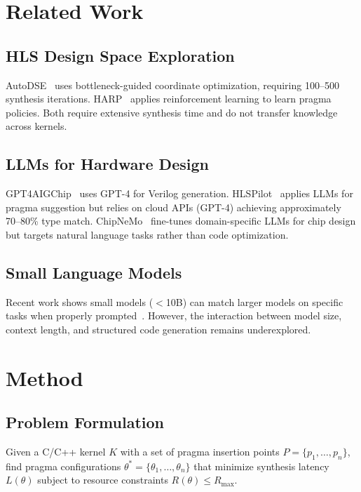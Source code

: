 \documentclass[conference]{IEEEtran}
\begin{document}
\section{Related Work}

\subsection{HLS Design Space Exploration}
AutoDSE~\cite{autodse} uses bottleneck-guided coordinate optimization, requiring
100--500 synthesis iterations. HARP~\cite{harp} applies reinforcement learning
to learn pragma policies. Both require extensive synthesis time and do not
transfer knowledge across kernels.

\subsection{LLMs for Hardware Design}
GPT4AIGChip~\cite{gpt4aigchip} uses GPT-4 for Verilog generation.
HLSPilot~\cite{hlspilot} applies LLMs for pragma suggestion but relies on
cloud APIs (GPT-4) achieving approximately 70--80\% type match.
ChipNeMo~\cite{chipnemo} fine-tunes domain-specific LLMs for chip design
but targets natural language tasks rather than code optimization.

\subsection{Small Language Models}
Recent work shows small models ($<$10B) can match larger models on specific
tasks when properly prompted~\cite{phi3}. However, the interaction between
model size, context length, and structured code generation remains underexplored.

\section{Method}

\subsection{Problem Formulation}
Given a C/C++ kernel $K$ with a set of pragma insertion points
$P = \{p_1, \ldots, p_n\}$, find pragma configurations
$\theta^* = \{\theta_1, \ldots, \theta_n\}$ that minimize synthesis latency
$L(\theta)$ subject to resource constraints $R(\theta) \leq R_{\max}$.
\end{document}
